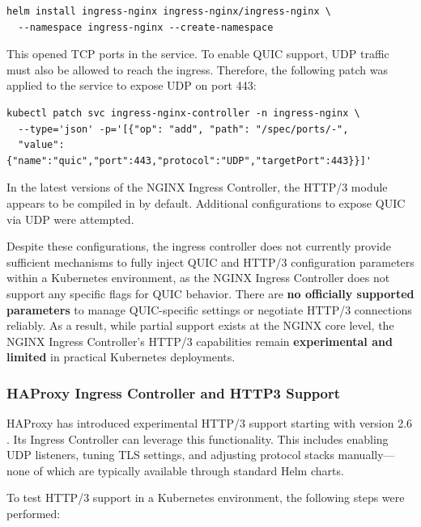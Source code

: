 \begin{lstlisting}[breaklines=true,basicstyle=\small\ttfamily,frame=single]
helm install ingress-nginx ingress-nginx/ingress-nginx \
  --namespace ingress-nginx --create-namespace
\end{lstlisting}

This opened TCP ports in the service. To enable QUIC support, UDP traffic must also be allowed to reach the ingress. Therefore, the following patch was applied to the service to expose UDP on port 443:

\begin{lstlisting}[breaklines=true,basicstyle=\small\ttfamily,frame=single]
kubectl patch svc ingress-nginx-controller -n ingress-nginx \
  --type='json' -p='[{"op": "add", "path": "/spec/ports/-", 
  "value": {"name":"quic","port":443,"protocol":"UDP","targetPort":443}}]'
\end{lstlisting}

In the latest versions of the NGINX Ingress Controller, the HTTP/3 module appears to be compiled in by default. Additional configurations to expose QUIC via UDP were attempted.

Despite these configurations, the ingress controller does not currently provide sufficient mechanisms to fully inject QUIC and HTTP/3 configuration parameters within a Kubernetes environment, as the NGINX Ingress Controller does not support any specific flags for QUIC behavior. There are \textbf{no officially supported parameters} to manage QUIC-specific settings or negotiate HTTP/3 connections reliably. As a result, while partial support exists at the NGINX core level, the NGINX Ingress Controller's HTTP/3 capabilities remain \textbf{experimental and limited} in practical Kubernetes deployments.



\subsubsection{HAProxy Ingress Controller and HTTP3 Support}
HAProxy has introduced experimental HTTP/3 support starting with version 2.6 \cite{haproxy-docs} \cite{haproxy-k8s-docs}. Its Ingress Controller can leverage this functionality. This includes enabling UDP listeners, tuning TLS settings, and adjusting protocol stacks manually—none of which are typically available through standard Helm charts. 


To test HTTP/3 support in a Kubernetes environment, the following steps were performed:

